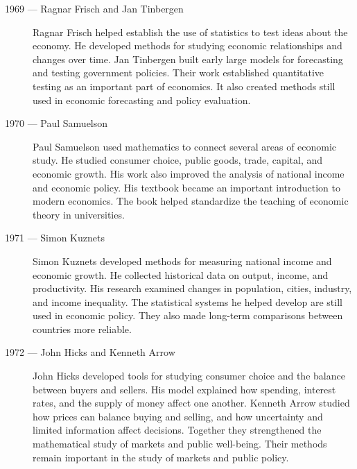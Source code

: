 \documentclass[12pt]{report}
\begin{document}
{\let\\\relax
\begin{description}

\item[1969 --- Ragnar Frisch and Jan Tinbergen]
Ragnar Frisch helped establish the use of statistics to test ideas about the economy.\\
He developed methods for studying economic relationships and changes over time.\\
Jan Tinbergen built early large models for forecasting and testing government policies.\\
Their work established quantitative testing as an important part of economics. It also created methods still used in economic forecasting and policy evaluation.

\item[1970 --- Paul Samuelson]
Paul Samuelson used mathematics to connect several areas of economic study.\\
He studied consumer choice, public goods, trade, capital, and economic growth.\\
His work also improved the analysis of national income and economic policy.\\
His textbook became an important introduction to modern economics. The book helped standardize the teaching of economic theory in universities.

\item[1971 --- Simon Kuznets]
Simon Kuznets developed methods for measuring national income and economic growth.\\
He collected historical data on output, income, and productivity.\\
His research examined changes in population, cities, industry, and income inequality.\\
The statistical systems he helped develop are still used in economic policy. They also made long-term comparisons between countries more reliable.

\item[1972 --- John Hicks and Kenneth Arrow]
John Hicks developed tools for studying consumer choice and the balance between buyers and sellers.\\
His model explained how spending, interest rates, and the supply of money affect one another.\\
Kenneth Arrow studied how prices can balance buying and selling, and how uncertainty and limited information affect decisions.\\
Together they strengthened the mathematical study of markets and public well-being. Their methods remain important in the study of markets and public policy.


\end{description}}
\end{document}
